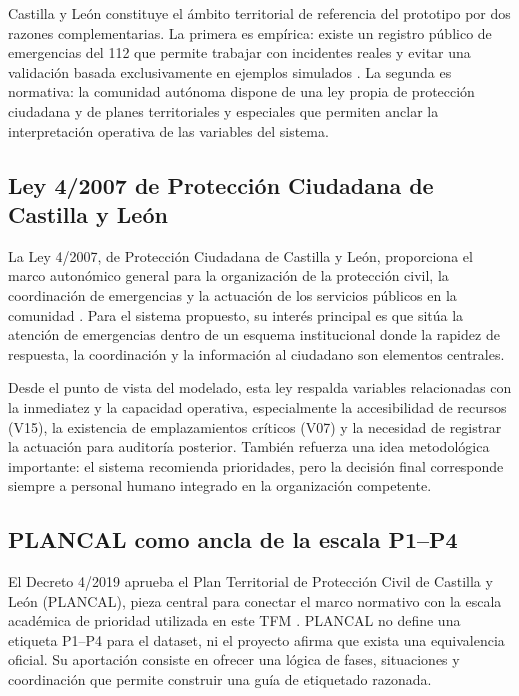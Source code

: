 Castilla y León constituye el ámbito territorial de referencia del prototipo por dos razones complementarias. La primera es empírica: existe un registro público de emergencias del 112 que permite trabajar con incidentes reales y evitar una validación basada exclusivamente en ejemplos simulados \cite{Registro112CyL}. La segunda es normativa: la comunidad autónoma dispone de una ley propia de protección ciudadana y de planes territoriales y especiales que permiten anclar la interpretación operativa de las variables del sistema.

\subsection{Ley 4/2007 de Protección Ciudadana de Castilla y León}

La Ley 4/2007, de Protección Ciudadana de Castilla y León, proporciona el marco autonómico general para la organización de la protección civil, la coordinación de emergencias y la actuación de los servicios públicos en la comunidad \cite{Ley4_2007_CYL}. Para el sistema propuesto, su interés principal es que sitúa la atención de emergencias dentro de un esquema institucional donde la rapidez de respuesta, la coordinación y la información al ciudadano son elementos centrales.

Desde el punto de vista del modelado, esta ley respalda variables relacionadas con la inmediatez y la capacidad operativa, especialmente la accesibilidad de recursos (V15), la existencia de emplazamientos críticos (V07) y la necesidad de registrar la actuación para auditoría posterior. También refuerza una idea metodológica importante: el sistema recomienda prioridades, pero la decisión final corresponde siempre a personal humano integrado en la organización competente.

\subsection{PLANCAL como ancla de la escala P1--P4}

El Decreto 4/2019 aprueba el Plan Territorial de Protección Civil de Castilla y León (PLANCAL), pieza central para conectar el marco normativo con la escala académica de prioridad utilizada en este TFM \cite{PLANCAL_DEC_4_2019}. PLANCAL no define una etiqueta P1--P4 para el dataset, ni el proyecto afirma que exista una equivalencia oficial. Su aportación consiste en ofrecer una lógica de fases, situaciones y coordinación que permite construir una guía de etiquetado razonada.

